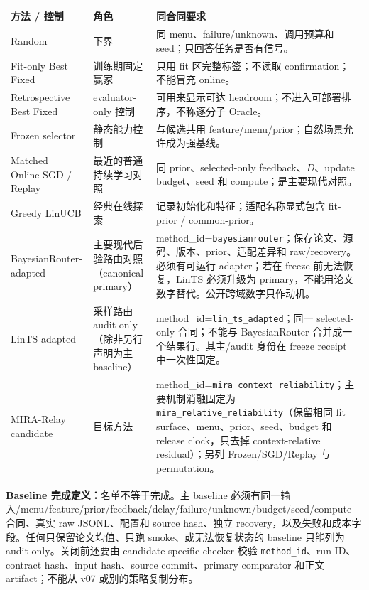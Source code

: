 \documentclass[10pt,letterpaper]{article}
\newcommand{\sect}[1]{\vspace{4pt}{\large\bfseries\color{GuideBlue}#1}\par\vspace{2pt}}
\newenvironment{clean}{\begin{center}\fontsize{8.55}{10.05}\selectfont\setlength{\tabcolsep}{3.7pt}\renewcommand{\arraystretch}{1.04}}{\end{center}}
\begin{document}
\sect{3. Baseline 合同：每个方法回答不同问题}
\begin{clean}
\begin{tabular}{@{}p{.22\linewidth}p{.19\linewidth}p{.46\linewidth}@{}}
\toprule
方法 / 控制 & 角色 & 同合同要求\\
\midrule
Random & 下界 & 同 menu、failure/unknown、调用预算和 seed；只回答任务是否有信号。\\
Fit-only Best Fixed & 训练期固定赢家 & 只用 fit 区完整标签；不读取 confirmation；不能冒充 online。\\
Retrospective Best Fixed & evaluator-only 控制 & 可用来显示可达 headroom；不进入可部署排序，不称逐分子 Oracle。\\
Frozen selector & 静态能力控制 & 与候选共用 feature/menu/prior；自然场景允许成为强基线。\\
Matched Online-SGD / Replay & 最近的普通持续学习对照 & 同 prior、selected-only feedback、$D$、update budget、seed 和 compute；是主要现代对照。\\
Greedy LinUCB & 经典在线探索 & 记录初始化和特征；适配名称显式包含 fit-prior / common-prior。\\
BayesianRouter-adapted & 主要现代后验路由对照（canonical primary） & method\_id=\texttt{bayesianrouter}；保存论文、源码、版本、prior、适配差异和 raw/recovery。必须有可运行 adapter；若在 freeze 前无法恢复，LinTS 必须升级为 primary，不能用论文数字替代。公开跨域数字只作动机。\\
LinTS-adapted & 采样路由 audit-only（除非另行声明为主 baseline） & method\_id=\texttt{lin\_ts\_adapted}；同一 selected-only 合同；不能与 BayesianRouter 合并成一个结果行。其主/audit 身份在 freeze receipt 中一次性固定。\\
MIRA-Relay candidate & 目标方法 & method\_id=\texttt{mira\_context\_reliability}；主要机制消融固定为 \texttt{mira\_relative\_reliability}（保留相同 fit surface、menu、prior、seed、budget 和 release clock，只去掉 context-relative residual）；另列 Frozen/SGD/Replay 与 permutation。\\
\bottomrule
\end{tabular}
\end{clean}
\textbf{Baseline 完成定义：}名单不等于完成。主 baseline 必须有同一输入/\allowbreak menu/\allowbreak feature/\allowbreak prior/\allowbreak feedback/\allowbreak delay/\allowbreak failure/\allowbreak unknown/\allowbreak budget/\allowbreak seed/\allowbreak compute 合同、真实 raw JSONL、配置和 source hash、独立 recovery，以及失败和成本字段。任何只保留论文均值、只跑 smoke、或无法恢复状态的 baseline 只能列为 audit-only。关闭前还要由 candidate-specific checker 校验 \texttt{method\_id}、run ID、contract hash、input hash、source commit、primary comparator 和正文 artifact；不能从 v07 或别的策略复制分布。
\end{document}
